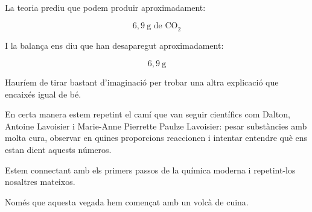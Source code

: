 La teoria prediu que podem produir aproximadament:

\[
6,9\ \text{g de CO}_{2}
\]

I la balança ens diu que han desaparegut aproximadament:

\[
6,9\ \text{g}
\]

Hauríem de tirar bastant d'imaginació per trobar una altra explicació que encaixés igual de bé.

En certa manera estem repetint el camí que van seguir científics com Dalton, Antoine Lavoisier i Marie-Anne Pierrette Paulze Lavoisier: pesar substàncies amb molta cura, observar en quines proporcions reaccionen i intentar entendre què ens estan dient aquests números.

Estem connectant amb els primers passos de la química moderna i repetint-los nosaltres mateixos.

Només que aquesta vegada hem començat amb un volcà de cuina.